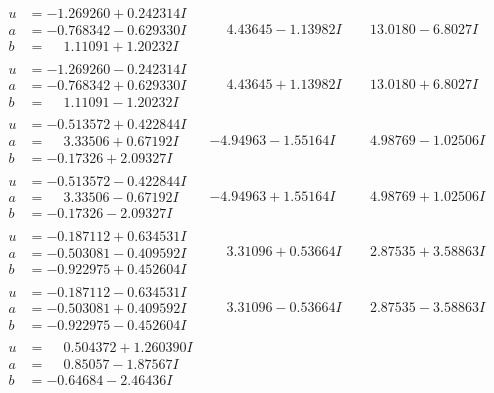 \documentclass[1p]{elsarticle_modified}
\theoremstyle{definition}
\begin{document}
$$\begin{array}{c|c|c}
\begin{aligned}
u &= -1.269260 + 0.242314 I \\
a &= -0.768342 - 0.629330 I \\
b &= \phantom{-}1.11091 + 1.20232 I\end{aligned}
 & \phantom{-}4.43645 - 1.13982 I & \phantom{-}13.0180 - 6.8027 I \\ \hline\begin{aligned}
u &= -1.269260 - 0.242314 I \\
a &= -0.768342 + 0.629330 I \\
b &= \phantom{-}1.11091 - 1.20232 I\end{aligned}
 & \phantom{-}4.43645 + 1.13982 I & \phantom{-}13.0180 + 6.8027 I \\ \hline\begin{aligned}
u &= -0.513572 + 0.422844 I \\
a &= \phantom{-}3.33506 + 0.67192 I \\
b &= -0.17326 + 2.09327 I\end{aligned}
 & -4.94963 - 1.55164 I & \phantom{-}4.98769 - 1.02506 I \\ \hline\begin{aligned}
u &= -0.513572 - 0.422844 I \\
a &= \phantom{-}3.33506 - 0.67192 I \\
b &= -0.17326 - 2.09327 I\end{aligned}
 & -4.94963 + 1.55164 I & \phantom{-}4.98769 + 1.02506 I \\ \hline\begin{aligned}
u &= -0.187112 + 0.634531 I \\
a &= -0.503081 - 0.409592 I \\
b &= -0.922975 + 0.452604 I\end{aligned}
 & \phantom{-}3.31096 + 0.53664 I & \phantom{-}2.87535 + 3.58863 I \\ \hline\begin{aligned}
u &= -0.187112 - 0.634531 I \\
a &= -0.503081 + 0.409592 I \\
b &= -0.922975 - 0.452604 I\end{aligned}
 & \phantom{-}3.31096 - 0.53664 I & \phantom{-}2.87535 - 3.58863 I \\ \hline\begin{aligned}
u &= \phantom{-}0.504372 + 1.260390 I \\
a &= \phantom{-}0.85057 - 1.87567 I \\
b &= -0.64684 - 2.46436 I\end{aligned}

\end{array}$$
\end{document}
